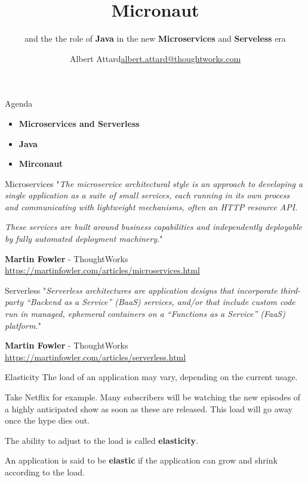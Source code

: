 \documentclass{beamer}
\title[Micronaut]{Micronaut}
\subtitle{and the the role of \textbf{Java} in the new \textbf{Microservices} and \textbf{Serveless} era}
\author{\texorpdfstring{Albert Attard\newline\url{albert.attard@thoughtworks.com}}{Albert Attard}}
\institute{\large \href{https://thoughtworks.com}{\textbf{ThoughtWorks}.com}}
\date{}
\begin{document}

  \begin{frame}
    \titlepage
  \end{frame}


  \begin{frame}[t]{Agenda}
    \begin{itemize}
      \item \textbf{Microservices and Serverless}
      \item \textbf{Java}
      \item \textbf{Mirconaut}
    \end{itemize}
  \end{frame}


  \begin{frame}[t]{Microservices}
    "\textit{The microservice architectural style is an approach to developing a single application as a suite of small services, each running in its own process and communicating with lightweight mechanisms, often an HTTP resource API.}

    \textit{These services are built around business capabilities and independently deployable by fully automated deployment machinery.}"

    \vspace{16pt}
    \textbf{Martin Fowler} - ThoughtWorks
    \newline
    {\footnotesize \href{https://martinfowler.com/articles/microservices.html}{https://martinfowler.com/articles/microservices.html}}
  \end{frame}


  \begin{frame}[t]{Serverless}
    "\textit{Serverless architectures are application designs that incorporate third-party “Backend as a Service” (BaaS) services, and/or that include custom code run in managed, ephemeral containers on a “Functions as a Service” (FaaS) platform.}"

    \vspace{16pt}
    \textbf{Martin Fowler} - ThoughtWorks
    {\footnotesize \href{https://martinfowler.com/articles/serverless.html}{https://martinfowler.com/articles/serverless.html}}
  \end{frame}


  \begin{frame}[t]{Elasticity}
    The load of an application may vary, depending on the current usage.

    Take Netflix for example. Many subscribers will be watching the new episodes of a highly anticipated show as soon as these are released. This load will go away once the hype dies out.

    The ability to adjust to the load is called \textbf{elasticity}.

    An application is said to be \textbf{elastic} if the application can grow and shrink according to the load.
  \end{frame}
\end{document}
